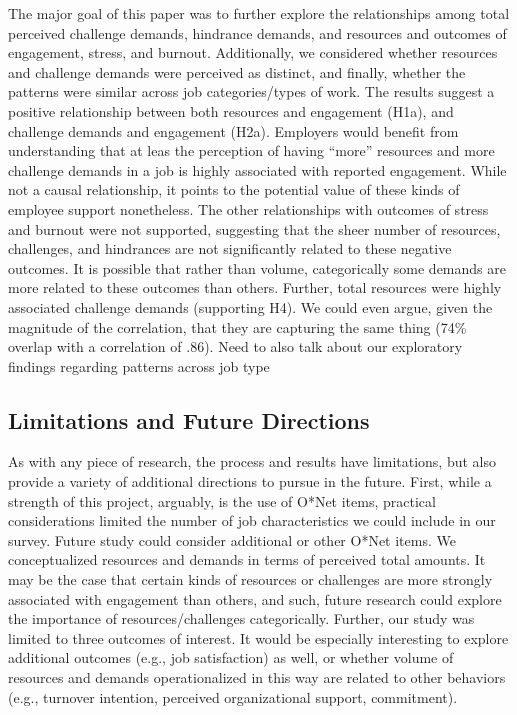\documentclass[
  man]{apa6}
\begin{document}
The major goal of this paper was to further explore the relationships among total perceived challenge demands, hindrance demands, and resources and outcomes of engagement, stress, and burnout. Additionally, we considered whether resources and challenge demands were perceived as distinct, and finally, whether the patterns were similar across job categories/types of work. The results suggest a positive relationship between both resources and engagement (H1a), and challenge demands and engagement (H2a). Employers would benefit from understanding that at leas the perception of having ``more'' resources and more challenge demands in a job is highly associated with reported engagement. While not a causal relationship, it points to the potential value of these kinds of employee support nonetheless. The other relationships with outcomes of stress and burnout were not supported, suggesting that the sheer number of resources, challenges, and hindrances are not significantly related to these negative outcomes. It is possible that rather than volume, categorically some demands are more related to these outcomes than others.
Further, total resources were highly associated challenge demands (supporting H4). We could even argue, given the magnitude of the correlation, that they are capturing the same thing (74\% overlap with a correlation of .86). Need to also talk about our exploratory findings regarding patterns across job type

\hypertarget{limitations-and-future-directions}{%
\subsection{Limitations and Future Directions}\label{limitations-and-future-directions}}

As with any piece of research, the process and results have limitations, but also provide a variety of additional directions to pursue in the future. First, while a strength of this project, arguably, is the use of O*Net items, practical considerations limited the number of job characteristics we could include in our survey. Future study could consider additional or other O*Net items. We conceptualized resources and demands in terms of perceived total amounts. It may be the case that certain kinds of resources or challenges are more strongly associated with engagement than others, and such, future research could explore the importance of resources/challenges categorically. Further, our study was limited to three outcomes of interest. It would be especially interesting to explore additional outcomes (e.g., job satisfaction) as well, or whether volume of resources and demands operationalized in this way are related to other behaviors (e.g., turnover intention, perceived organizational support, commitment).
\end{document}

